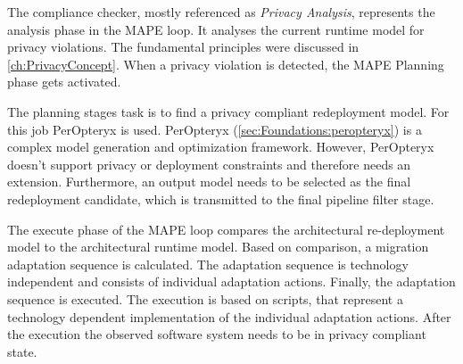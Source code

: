 The compliance checker, mostly referenced as \textit{Privacy Analysis}, represents the analysis phase in the MAPE loop. It analyses the current runtime model for privacy violations. The fundamental principles were discussed in \autoref{ch:PrivacyConcept}. When a privacy violation is detected, the MAPE Planning phase gets activated.

The planning stages task is to find a privacy compliant redeployment model. For this job PerOpteryx is used. PerOpteryx (\autoref{sec:Foundations:peropteryx}) is a complex model generation and optimization framework. However, PerOpteryx doesn't support privacy or deployment constraints and therefore needs an extension. Furthermore, an output model needs to be selected as the final redeployment candidate, which is transmitted to the final pipeline filter stage.

The execute phase of the MAPE loop compares the architectural re-deployment model to the architectural runtime model. Based on comparison, a migration adaptation sequence is calculated. The adaptation sequence is technology independent and consists of individual adaptation actions. Finally, the adaptation sequence is executed. The execution is based on scripts, that represent a technology dependent implementation of the individual adaptation actions. After the execution the observed software system needs to be in privacy compliant state.